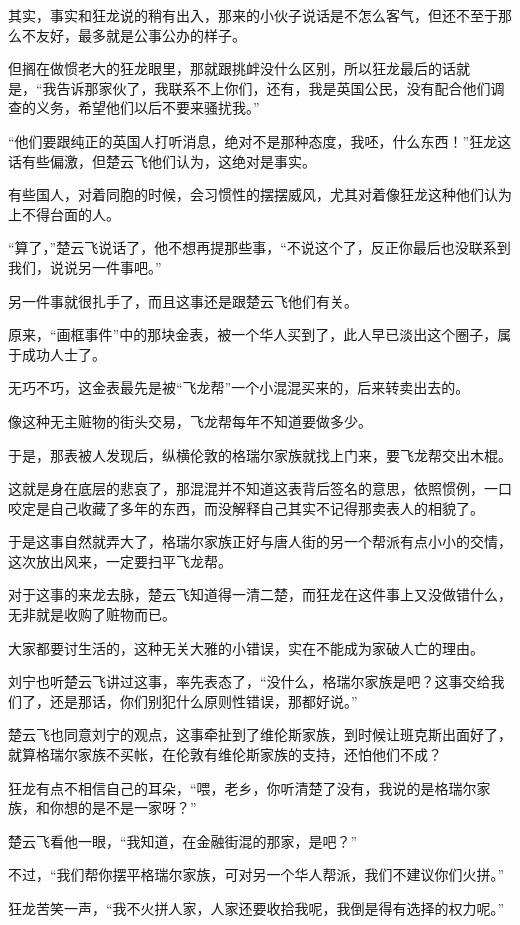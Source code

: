 其实，事实和狂龙说的稍有出入，那来的小伙子说话是不怎么客气，但还不至于那么不友好，最多就是公事公办的样子。

但搁在做惯老大的狂龙眼里，那就跟挑衅没什么区别，所以狂龙最后的话就是，“我告诉那家伙了，我联系不上你们，还有，我是英国公民，没有配合他们调查的义务，希望他们以后不要来骚扰我。”

“他们要跟纯正的英国人打听消息，绝对不是那种态度，我呸，什么东西！”狂龙这话有些偏激，但楚云飞他们认为，这绝对是事实。

有些国人，对着同胞的时候，会习惯性的摆摆威风，尤其对着像狂龙这种他们认为上不得台面的人。

“算了，”楚云飞说话了，他不想再提那些事，“不说这个了，反正你最后也没联系到我们，说说另一件事吧。”

另一件事就很扎手了，而且这事还是跟楚云飞他们有关。

原来，“画框事件”中的那块金表，被一个华人买到了，此人早已淡出这个圈子，属于成功人士了。

无巧不巧，这金表最先是被“飞龙帮”一个小混混买来的，后来转卖出去的。

像这种无主赃物的街头交易，飞龙帮每年不知道要做多少。

于是，那表被人发现后，纵横伦敦的格瑞尔家族就找上门来，要飞龙帮交出木棍。

这就是身在底层的悲哀了，那混混并不知道这表背后签名的意思，依照惯例，一口咬定是自己收藏了多年的东西，而没解释自己其实不记得那卖表人的相貌了。

于是这事自然就弄大了，格瑞尔家族正好与唐人街的另一个帮派有点小小的交情，这次放出风来，一定要扫平飞龙帮。

对于这事的来龙去脉，楚云飞知道得一清二楚，而狂龙在这件事上又没做错什么，无非就是收购了赃物而已。

大家都要讨生活的，这种无关大雅的小错误，实在不能成为家破人亡的理由。

刘宁也听楚云飞讲过这事，率先表态了，“没什么，格瑞尔家族是吧？这事交给我们了，还是那话，你们别犯什么原则性错误，那都好说。”

楚云飞也同意刘宁的观点，这事牵扯到了维伦斯家族，到时候让班克斯出面好了，就算格瑞尔家族不买帐，在伦敦有维伦斯家族的支持，还怕他们不成？

狂龙有点不相信自己的耳朵，“喂，老乡，你听清楚了没有，我说的是格瑞尔家族，和你想的是不是一家呀？”

楚云飞看他一眼，“我知道，在金融街混的那家，是吧？”

不过，“我们帮你摆平格瑞尔家族，可对另一个华人帮派，我们不建议你们火拼。”

狂龙苦笑一声，“我不火拼人家，人家还要收拾我呢，我倒是得有选择的权力呢。”

